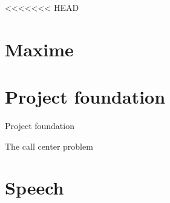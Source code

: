 <<<<<<< HEAD
\section{Maxime}

\section{Project foundation}
\begin{frame}{Project foundation}
	\begin{center}
	The call center problem 
	\end{center}
\end{frame}

\section{Speech}
